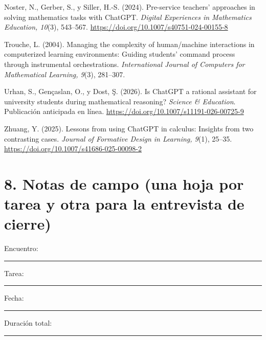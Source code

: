 \documentclass[11pt,letterpaper]{article}
\begin{document}
Noster, N., Gerber, S., y Siller, H.-S. (2024). Pre-service teachers' approaches in solving mathematics tasks with ChatGPT. \emph{Digital Experiences in Mathematics Education, 10}(3), 543--567. \url{https://doi.org/10.1007/s40751-024-00155-8}

Trouche, L. (2004). Managing the complexity of human/machine interactions in computerized learning environments: Guiding students' command process through instrumental orchestrations. \emph{International Journal of Computers for Mathematical Learning, 9}(3), 281--307.

Urhan, S., Gençaslan, O., y Dost, Ş. (2026). Is ChatGPT a rational assistant for university students during mathematical reasoning? \emph{Science \& Education}. Publicación anticipada en línea. \url{https://doi.org/10.1007/s11191-026-00725-9}

Zhuang, Y. (2025). Lessons from using ChatGPT in calculus: Insights from two contrasting cases. \emph{Journal of Formative Design in Learning, 9}(1), 25--35. \url{https://doi.org/10.1007/s41686-025-00098-2}

\setlength{\leftskip}{0pt}\setlength{\parindent}{0pt}
\normalsize

\newpage
\section*{8. Notas de campo \normalfont\small(una hoja por tarea y otra para la entrevista de cierre)}

Encuentro: \rule{1cm}{0.4pt} \quad Tarea: \rule{1.2cm}{0.4pt} \quad Fecha: \rule{2.4cm}{0.4pt} \quad Duración total: \rule{1.6cm}{0.4pt}
\end{document}
